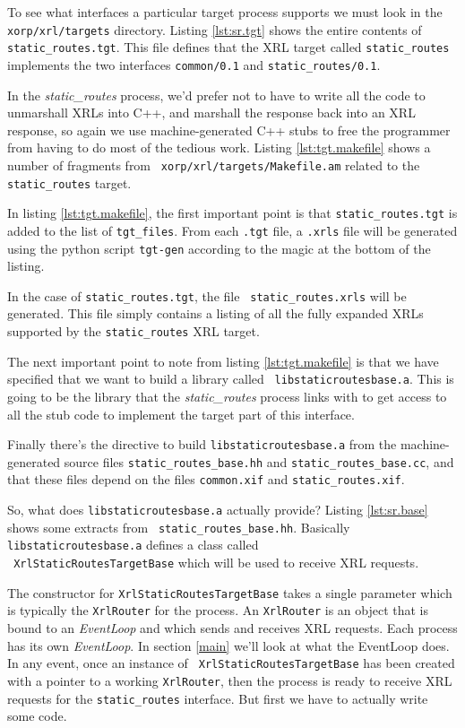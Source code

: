 \documentclass[11pt]{article}
\newcommand{\stt}{\tt\small}
\newcommand{\SR}{{\tt\small static\_routes}\xspace}
\newcommand{\SRI}{{\it static\_routes}\xspace}
\begin{document}
\vspace{0.1in}
To see what interfaces a particular target process supports we must
look in the {\stt xorp/xrl/targets} directory.  Listing
\ref{lst:sr.tgt} shows the entire contents of {\stt
static\_routes.tgt}.
This file defines that the XRL target called \SR implements the two
interfaces {\stt common/0.1} and {\stt static\_routes/0.1}.

In the \SRI process, we'd prefer not to have to write all the code to
unmarshall XRLs into C++, and marshall the response back into an XRL
response, so again we use machine-generated C++ stubs to free the
programmer from having to do most of the tedious work.  Listing
\ref{lst:tgt.makefile} shows a number of fragments from {\stt
xorp/xrl/targets/Makefile.am} related to the {\stt static\_routes}
target.


In listing \ref{lst:tgt.makefile}, the first important point is that
{\stt static\_routes.tgt} is added to the list of {\stt tgt\_files}.
From each {\stt .tgt} file, a {\stt .xrls} file will be generated
using the python script {\stt tgt-gen} according to the magic at the
bottom of the listing.

In the case of {\stt static\_routes.tgt}, the file {\stt
static\_routes.xrls} will be generated.  This file simply contains a
listing of all the fully expanded XRLs supported by the \SR XRL
target.

The next important point to note from listing \ref{lst:tgt.makefile}
is that we have specified that we want to build a library called {\stt
libstaticroutesbase.a}.  This is going to be the library that the \SRI
process links with to get access to all the stub code to implement
the target part of this interface.

Finally there's the directive to build {\stt libstaticroutesbase.a}
from the machine-generated source files {\stt static\_routes\_base.hh}
and {\stt static\_routes\_base.cc}, and that these files depend on the
files {\stt common.xif} and {\stt static\_routes.xif}.

\vspace{0.1in}
So, what does {\stt libstaticroutesbase.a} actually provide?  Listing
\ref{lst:sr.base} shows some extracts from {\stt
static\_routes\_base.hh}.
Basically {\stt libstaticroutesbase.a} defines a class called \\
{\stt
XrlStaticRoutesTargetBase} which will be used to receive XRL requests.

The constructor for {\stt XrlStaticRoutesTargetBase} takes a single
parameter which is typically the {\stt XrlRouter} for the process.  An
{\stt XrlRouter} is an object that is bound to an {\it EventLoop} and
which sends and receives XRL requests.  Each process has its own {\it
EventLoop}.  In section \ref{main} we'll look at what the EventLoop
does.  In any event, once an instance of {\stt
XrlStaticRoutesTargetBase} has been created with a pointer to a
working {\stt XrlRouter}, then the process is ready to receive XRL
requests for the \SR interface.  But first we have to actually write
some code.
\end{document}

